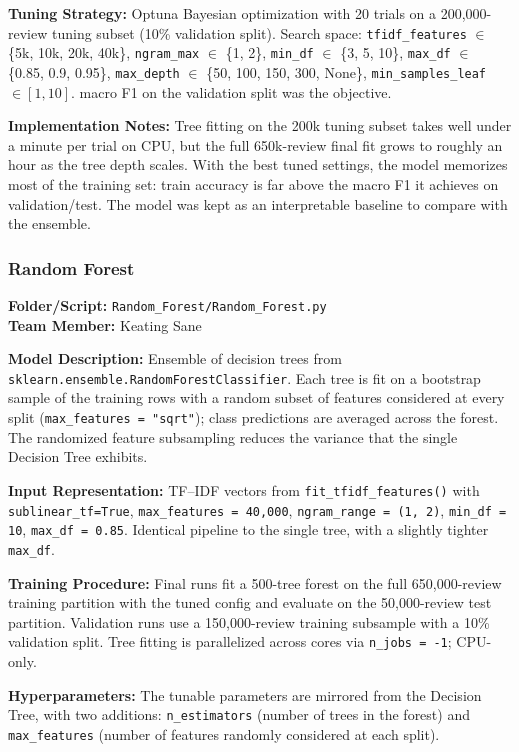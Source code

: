 \documentclass[12pt]{article}
\begin{document}
\textbf{Tuning Strategy:} Optuna Bayesian optimization with 20 trials on a 200,000-review tuning subset (10\% validation split). Search space: \texttt{tfidf\_features} $\in$ \{5k, 10k, 20k, 40k\}, \texttt{ngram\_max} $\in$ \{1, 2\}, \texttt{min\_df} $\in$ \{3, 5, 10\}, \texttt{max\_df} $\in$ \{0.85, 0.9, 0.95\}, \texttt{max\_depth} $\in$ \{50, 100, 150, 300, None\}, \texttt{min\_samples\_leaf} $\in [1, 10]$. macro F1 on the validation split was the objective.

\textbf{Implementation Notes:} Tree fitting on the 200k tuning subset takes well under a minute per trial on CPU, but the full 650k-review final fit grows to roughly an hour as the tree depth scales. With the best tuned settings, the model memorizes most of the training set: train accuracy is far above the macro F1 it achieves on validation/test. The model was kept as an interpretable baseline to compare with the ensemble.

\subsubsection{Random Forest}
\textbf{Folder/Script:} \texttt{Random\_Forest/Random\_Forest.py}\\
\textbf{Team Member:} Keating Sane

\textbf{Model Description:} Ensemble of decision trees from \texttt{sklearn.ensemble.RandomForestClassifier}. Each tree is fit on a bootstrap sample of the training rows with a random subset of features considered at every split (\texttt{max\_features = "sqrt"}); class predictions are averaged across the forest. The randomized feature subsampling reduces the variance that the single Decision Tree exhibits.

\textbf{Input Representation:} TF--IDF vectors from \texttt{fit\_tfidf\_features()} with \texttt{sublinear\_tf=True}, \texttt{max\_features = 40,000}, \texttt{ngram\_range = (1, 2)}, \texttt{min\_df = 10}, \texttt{max\_df = 0.85}. Identical pipeline to the single tree, with a slightly tighter \texttt{max\_df}.

\textbf{Training Procedure:} Final runs fit a 500-tree forest on the full 650,000-review training partition with the tuned config and evaluate on the 50,000-review test partition. Validation runs use a 150,000-review training subsample with a 10\% validation split. Tree fitting is parallelized across cores via \texttt{n\_jobs = -1}; CPU-only.

\textbf{Hyperparameters:} The tunable parameters are mirrored from the Decision Tree, with two additions: \texttt{n\_estimators} (number of trees in the forest) and \texttt{max\_features} (number of features randomly considered at each split).
\end{document}
